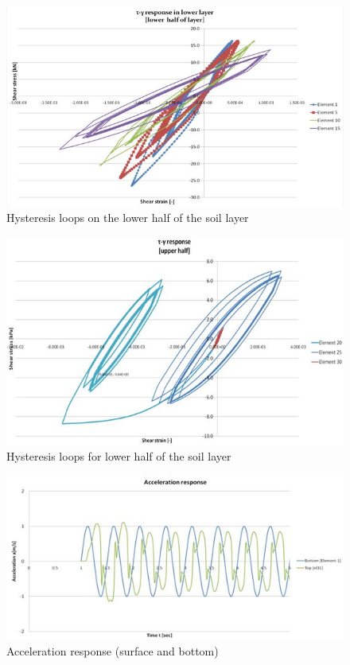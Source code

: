 \documentclass[10pt,a4paper]{report}
\begin{document}
\begin{figure}[h!]
		\centering
		\includegraphics[width=0.7\linewidth]{"response1"}
		\caption[]{Hysteresis loops on the lower half of the soil layer}
		\label{response1}
	\end{figure}
	
	\begin{figure}[h!]
		\centering
		\includegraphics[width=0.7\linewidth]{"response2"}
		\caption[]{Hysteresis loops for lower half of the soil layer}
		\label{response2}
	\end{figure}
	
	\begin{figure}[h!]
		\centering
		\includegraphics[width=0.7\linewidth]{"acc_response1"}
		\caption{Acceleration response (surface and bottom)}
		\label{acc1}
	\end{figure}
	
\end{document}
